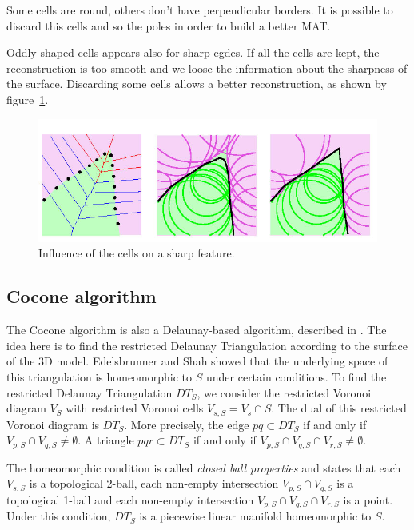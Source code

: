 \documentclass[a4paper]{article}
\begin{document}
Some cells are round, others don't have perpendicular borders. It is possible to discard this cells and so the poles in order to build a better MAT. 

Oddly shaped cells appears also for sharp egdes. If all the cells are kept, the reconstruction is too smooth and we loose the information about the sharpness of the surface. Discarding some cells allows a better reconstruction, as shown by figure~\ref{sharpPC}.

\begin{figure}[h]
  \centering
  \includegraphics[scale=0.3]{sharpPC.jpg}
  \caption{\label{sharpPC} Influence of the cells on a sharp feature.}
\end{figure}

\subsection{Cocone algorithm}
The Cocone algorithm is also a Delaunay-based algorithm, described in \cite{Cocone}. The idea here is to find the restricted Delaunay Triangulation according to the surface of the 3D model. Edelsbrunner and Shah showed that the underlying space of this triangulation is homeomorphic to $S$ under certain conditions. To find the restricted Delaunay Triangulation $DT_S$, we consider the restricted Voronoi diagram $V_S$ with restricted Voronoi cells $V_{s,S} = V_s\cap S$. The dual of this restricted Voronoi diagram is $DT_S$. More precisely, the edge $pq \subset DT_S$ if and only if $V_{p,S}\cap V_{q,S} \ne \emptyset$. A triangle $pqr \subset DT_S$ if and only if $V_{p,S}\cap V_{q,S}\cap V_{r,S} \ne \emptyset$.

The homeomorphic condition is called \emph{closed ball properties} and states that each $V_{s,S}$ is a topological 2-ball, each non-empty intersection $V_{p,S}\cap V_{q,S}$ is a topological 1-ball and each non-empty intersection $V_{p,S}\cap V_{q,S}\cap V_{r,S}$ is a point. Under this condition, $DT_S$ is a piecewise linear manifold homeomorphic to $S$.
\end{document}
